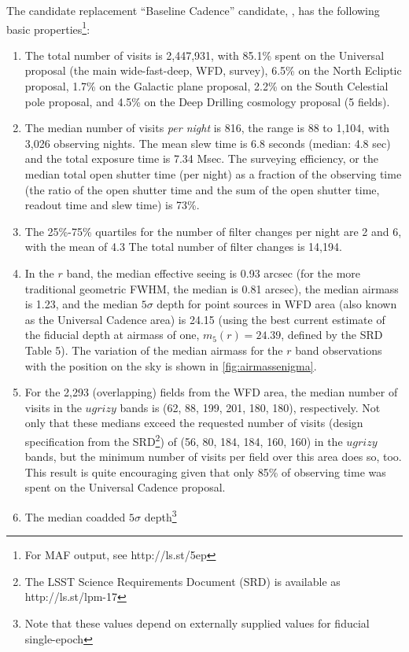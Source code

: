 The candidate replacement ``Baseline Cadence'' candidate,
, has the following basic
properties\footnote{For MAF output, see http://ls.st/5ep}:
\begin{enumerate}
\item The total number of visits is 2,447,931, with 85.1\% spent on
the Universal proposal (the main wide-fast-deep, WFD, survey), 6.5\% on the
North Ecliptic proposal, 1.7\% on the Galactic plane proposal, 2.2\%
on the South Celestial pole proposal, and 4.5\% on the Deep Drilling
cosmology proposal (5 fields).
\item The median number of visits {\it per night} is 816, the range is
88 to 1,104, with 3,026 observing nights. The mean slew time is 6.8
seconds (median: 4.8 sec) and the total exposure time is 7.34 Msec. 
The surveying efficiency, or the median total open shutter time (per night) 
as a fraction of the observing time (the ratio of the open shutter time and
the sum of the open shutter time, readout time and slew time) is 73\%. 
\item 
The 25\%-75\% quartiles for the number of filter changes per night are 2
and 6, with the mean of 4.3 The total number of filter changes is 14,194. 
\item In the $r$ band, the median effective seeing is 0.93 arcsec (for the more
traditional geometric FWHM, the median is 0.81 arcsec), the median
airmass is 1.23, and the median $5\sigma$ depth for point sources in WFD
area (also known as the Universal Cadence area) is 24.15 (using the best 
current estimate of the fiducial depth at airmass of one, $m_5(r)=24.39$, 
defined by the SRD Table 5). The variation of the median airmass for the $r$ 
band observations with the position on the sky is shown in
\autoref{fig:airmassenigma}.
\item For the 2,293 (overlapping) fields from the WFD area, 
the median number of visits in the $ugrizy$ bands is (62, 88, 199, 201, 180,
180), respectively. Not only that these medians exceed the requested
number of visits (design specification from the SRD\footnote{The LSST
Science Requirements Document (SRD) is available as
http://ls.st/lpm-17}) of (56, 80, 184, 184, 160, 160) in the $ugrizy$
bands, but the minimum number of visits per field over this area does
so, too. This result is quite encouraging given that 
only 85\% of observing time was spent on the Universal Cadence proposal. 
\item The median coadded $5\sigma$ depth\footnote{Note that these values
depend on externally supplied values for fiducial single-epoch
}
\end{enumerate}
